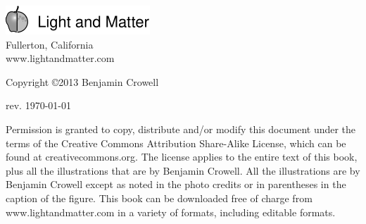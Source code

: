 \thispagestyle{empty}

\vspace{100mm}

\noindent
\includegraphics{cover/lmlogo}\\
Fullerton, California\\
www.lightandmatter.com

\vspace{20mm}
\noindent
Copyright \copyright  2013 Benjamin Crowell

\vspace{20mm}
\noindent
rev. \today{}

\vspace{6mm}
\noindent
Permission is granted to copy, distribute and/or modify this
document under the terms of the Creative Commons Attribution
Share-Alike License, which can be found at creativecommons.org. The license
applies to the entire text of this book, plus all the illustrations
that are by Benjamin Crowell. All the illustrations are by Benjamin
Crowell except as noted in the photo credits or in parentheses
in the caption of the figure.
This book can be downloaded free of charge
from www.lightandmatter.com in a variety of formats,
including editable formats.
